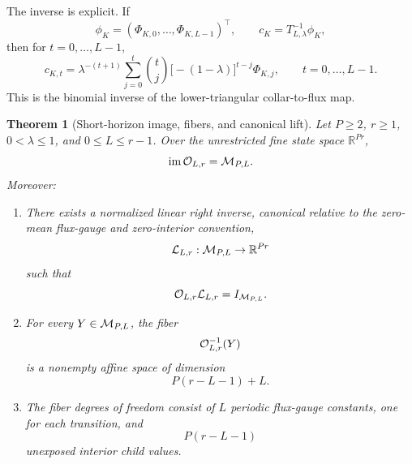 \documentclass[11pt]{article}
\newtheorem{theorem}{Theorem}
\newcommand{\R}{\mathbb R}
\DeclareMathOperator{\im}{im}
\begin{document}
The inverse is explicit.  If
\[
  \phi_K=(\Phi_{K,0},\ldots,\Phi_{K,L-1})^\top,
  \qquad
  c_K=T_{L,\lambda}^{-1}\phi_K,
\]
then for \(t=0,\ldots,L-1\),
\[
  c_{K,t}
  =
  \lambda^{-(t+1)}
  \sum_{j=0}^{t}
  \binom{t}{j}
  \bigl[-(1-\lambda)\bigr]^{t-j}
  \Phi_{K,j},
  \qquad
  t=0,\ldots,L-1.
\]
This is the binomial inverse of the lower-triangular collar-to-flux map.

\begin{theorem}[Short-horizon image, fibers, and canonical lift]
\label{thm:short-realization}
Let \(P\ge2\), \(r\ge1\), \(0<\lambda\le1\), and \(0\le L\le r-1\).  Over
the unrestricted fine state space \(\R^{Pr}\),
\[
  \im{\cal O}_{L,r}={\cal M}_{P,L}.
\]
Moreover:
\begin{enumerate}
\item There exists a normalized linear right inverse, canonical relative to the
zero-mean flux-gauge and zero-interior convention,
\[
  {\cal L}_{L,r}:{\cal M}_{P,L}\to\R^{Pr}
\]
such that
\[
  {\cal O}_{L,r}{\cal L}_{L,r}=I_{{\cal M}_{P,L}}.
\]

\item For every \(Y\in{\cal M}_{P,L}\), the fiber
\[
  {\cal O}_{L,r}^{-1}(Y)
\]
is a nonempty affine space of dimension
\[
  P(r-L-1)+L.
\]

\item The fiber degrees of freedom consist of \(L\) periodic flux-gauge
constants, one for each transition, and
\[
  P(r-L-1)
\]
unexposed interior child values.
\end{enumerate}
\end{theorem}
\end{document}
